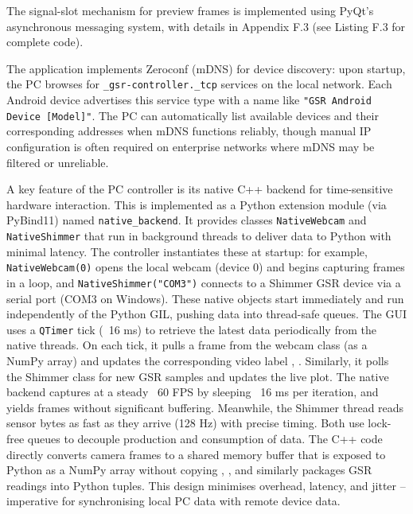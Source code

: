 The signal-slot mechanism for preview frames is implemented using PyQt's asynchronous messaging system, with details in Appendix F.3 (see Listing F.3 for complete code).

The application implements Zeroconf (mDNS) \cite{ref19} for device discovery: upon startup, the PC browses for \texttt{\_gsr-controller.\_tcp} services on the local network. Each Android device advertises this service type with a name like \texttt{"GSR Android Device [Model]"}. The PC can automatically list available devices and their corresponding addresses when mDNS functions reliably, though manual IP configuration is often required on enterprise networks where mDNS may be filtered or unreliable.

A key feature of the PC controller is its native C++ backend for time-sensitive hardware interaction. This is implemented as a Python extension module (via PyBind11) \cite{ref18} named \texttt{native\_backend}. It provides classes \texttt{NativeWebcam} and \texttt{NativeShimmer} that run in background threads to deliver data to Python with minimal latency. The controller instantiates these at startup: for example, \texttt{NativeWebcam(0)} opens the local webcam (device 0) and begins capturing frames in a loop, and \texttt{NativeShimmer("COM3")} connects to a Shimmer GSR device via a serial port (COM3 on Windows). These native objects start immediately and run independently of the Python GIL, pushing data into thread-safe queues. The GUI uses a \texttt{QTimer} tick (~16 ms) to retrieve the latest data periodically from the native threads. On each tick, it pulls a frame from the webcam class (as a NumPy array) and updates the corresponding video label \cite{ref1}, \cite{ref2}. Similarly, it polls the Shimmer class for new GSR samples and updates the live plot. The native backend captures at a steady ~60 FPS by sleeping ~16 ms per iteration, and yields frames without significant buffering. Meanwhile, the Shimmer thread reads sensor bytes as fast as they arrive (128 Hz) with precise timing. Both use lock-free queues to decouple production and consumption of data. The C++ code directly converts camera frames to a shared memory buffer that is exposed to Python as a NumPy array without copying \cite{ref1}, \cite{ref2}, and similarly packages GSR readings into Python tuples. This design minimises overhead, latency, and jitter -- imperative for synchronising local PC data with remote device data.

